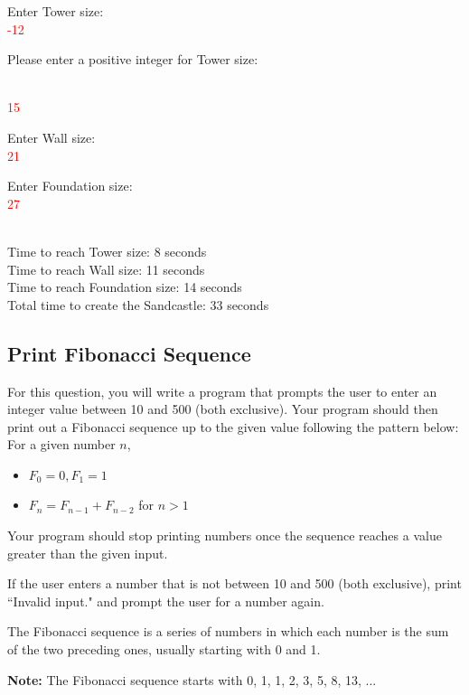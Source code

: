 \begin{sample}

Enter Tower size: \\\textcolor{red}{-12}

Please enter a positive integer for Tower size:

\\\textcolor{red}{15}

Enter Wall size: \\\textcolor{red}{21}

Enter Foundation size: \\\textcolor{red}{27}

\\Time to reach Tower size: 8 seconds
\\Time to reach Wall size: 11 seconds
\\Time to reach Foundation size: 14 seconds
\\Total time to create the Sandcastle: 33 seconds

\end{sample}



\subsection{Print Fibonacci Sequence}

For this question, you will write a program that prompts the user to enter an integer value between 10 and 500 (both exclusive). Your program should then print out a Fibonacci sequence up to the given value following the pattern below:
For a given number $n$,

\begin{itemize}
\item $F_0 = 0, F_1 = 1$
\item $F_n = F_{n-1} + F_{n-2}$ for $n > 1$
\end{itemize}

Your program should stop printing numbers once the sequence reaches a value greater than the given input.

If the user enters a number that is not between 10 and 500 (both exclusive), print ``Invalid input." and prompt the user for a number again.

The Fibonacci sequence is a series of numbers in which each number is the sum of the two preceding ones, usually starting with 0 and 1.

\textbf{Note:} The Fibonacci sequence starts with 0, 1, 1, 2, 3, 5, 8, 13, ...

